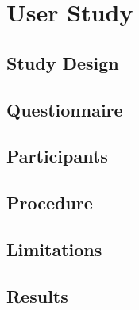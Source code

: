 \documentclass[Medieninformatik-arbeit.tex]{subfiles}
\begin{document}
\label{ch:study}
\section{User Study}

\subsection{Study Design}
\subsection{Questionnaire}
\subsection{Participants}
\subsection{Procedure}
\subsection{Limitations}
\subsection{Results}
\end{document}
